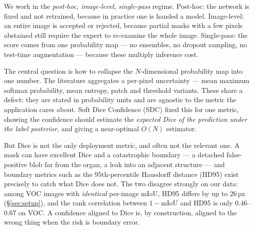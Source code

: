 \documentclass[11pt]{article}
\theoremstyle{remark}
\begin{document}
We work in the \emph{post-hoc, image-level, single-pass} regime. Post-hoc: the
network is fixed and not retrained, because in practice one is handed a model.
Image-level: an entire image is accepted or rejected, because partial masks with a
few pixels abstained still require the expert to re-examine the whole image.
Single-pass: the score comes from one probability map --- no ensembles, no dropout
sampling, no test-time augmentation --- because these multiply inference cost.

The central question is how to collapse the $N$-dimensional probability map into
one number. The literature aggregates a per-pixel uncertainty --- mean maximum
softmax probability, mean entropy, patch and threshold variants. These share a
defect: they are stated in probability units and are agnostic to the metric the
application cares about. Soft Dice Confidence (SDC) \cite{sdc} fixed this for one
metric, showing the confidence should estimate the \emph{expected Dice of the
prediction under the label posterior}, and giving a near-optimal $O(N)$ estimator.

But Dice is not the only deployment metric, and often not the relevant one. A mask
can have excellent Dice and a catastrophic boundary --- a detached false-positive
blob far from the organ, a leak into an adjacent structure --- and boundary metrics
such as the $95$th-percentile Hausdorff distance (HD95) exist precisely to catch
what Dice does not. The two disagree strongly on our data: among VOC images with
\emph{identical} per-image mIoU, HD95 differs by up to $26$\,px
(\S\ref{sec:setup}), and the rank correlation between $1-\mathrm{mIoU}$ and HD95 is
only $0.46$--$0.67$ on VOC. A confidence aligned to Dice is, by construction,
aligned to the wrong thing when the risk is boundary error.
\end{document}
